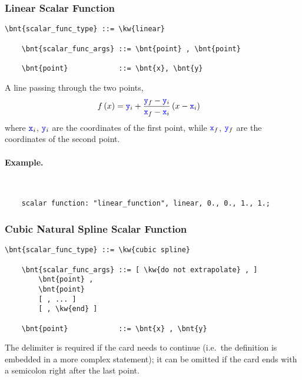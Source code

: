 \subsubsection{Linear Scalar Function}
\begin{Verbatim}[commandchars=\\\{\}]
    \bnt{scalar_func_type} ::= \kw{linear}

    \bnt{scalar_func_args} ::= \bnt{point} , \bnt{point}

    \bnt{point}            ::= \bnt{x}, \bnt{y}
\end{Verbatim}
A line passing through the two points,
\begin{align}
	f\left( x \right)
	&=
	\textcolor{blue}{\texttt{y}}_i
	+
	\frac{\textcolor{blue}{\texttt{y}}_f - \textcolor{blue}{\texttt{y}}_i}{\textcolor{blue}{\texttt{x}}_f - \textcolor{blue}{\texttt{x}}_i} \left( x - \textcolor{blue}{\texttt{x}}_i \right)
\end{align}
where $\textcolor{blue}{\texttt{x}}_i$, $\textcolor{blue}{\texttt{y}}_i$ are the coordinates of the first point,
while $\textcolor{blue}{\texttt{x}}_f$, $\textcolor{blue}{\texttt{y}}_f$ are the coordinates of the second point.

\paragraph{Example.} \
\begin{verbatim}
    scalar function: "linear_function", linear, 0., 0., 1., 1.;
\end{verbatim}

\subsubsection{Cubic Natural Spline Scalar Function}
\begin{Verbatim}[commandchars=\\\{\}]
    \bnt{scalar_func_type} ::= \kw{cubic spline}

    \bnt{scalar_func_args} ::= [ \kw{do not extrapolate} , ]
        \bnt{point} ,
        \bnt{point}
        [ , ... ]
        [ , \kw{end} ]

    \bnt{point}            ::= \bnt{x} , \bnt{y}
\end{Verbatim}
The  delimiter is required if the card needs to continue
(i.e.\ the \hty{ScalarFunction} definition is embedded in a more complex
statement); it can be omitted if the card ends with a semicolon
right after the last point.

